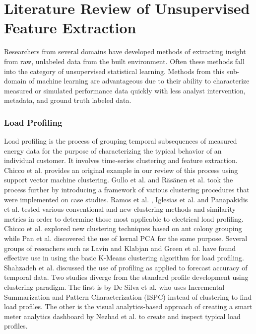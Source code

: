 \section{Literature Review of Unsupervised Feature Extraction}

Researchers from several domains have developed methods of extracting insight from raw, unlabeled data from the built environment. Often these methods fall into the category of unsupervised statistical learning. Methods from this sub-domain of machine learning are advantageous due to their ability to characterize measured or simulated performance data quickly with less analyst intervention, metadata, and ground truth labeled data. 

\subsubsection{Load Profiling}
Load profiling is the process of grouping temporal subsequences of measured energy data for the purpose of characterizing the typical behavior of an individual customer. It involves time-series clustering and feature extraction. Chicco et al. \cite{chicco_support_2009} provides an original example in our review of this process using support vector machine clustering. Gullo et al. \cite{gullo_low-voltage_2009} and R\"as\"anen et al. \cite{rasanen_feature-based_2009} took the process further by introducing a framework of various clustering procedures that were implemented on case studies. Ramos et al. \cite{ramos_typical_2012}, Iglesias et al. \cite{iglesias_analysis_2013} and Panapakidis et al. \cite{panapakidis_evaluation_2015} tested various conventional and new clustering methods and similarity metrics in order to determine those most applicable to electrical load profiling. Chicco et al. \cite{chicco_electrical_2013} explored new clustering techniques based on ant colony grouping while Pan et al. \cite{pan_kernel-based_2015} discovered the use of kernal PCA for the same purpose. Several groups of reseachers such as Lavin and Klabjan \cite{lavin_clustering_2014} and Green et al. \cite{green_divide_2014} have found effective use in using the basic K-Means clustering algorithm for load profiling. Shahzadeh et al. \cite{shahzadeh_improving_2015} discussed the use of profiling as applied to forecast accuracy of temporal data. Two studies diverge from the standard profile development using clustering paradigm. The first is by De Silva et al. \cite{de_silva_data_2011} who uses Incremental Summarization and Pattern Characterization (ISPC) instead of clustering to find load profiles. The other is the visual analytics-based approach of creating a smart meter analytics dashboard by Nezhad et al. \cite{jarrah_nezhad_smartd:_2014} to create and inspect typical load profiles.

